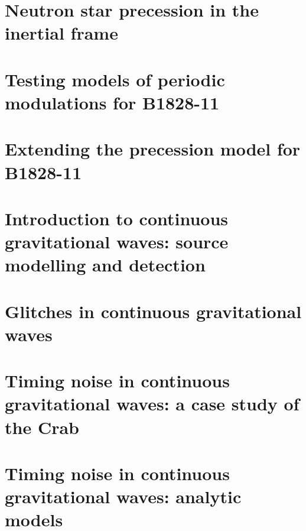 \documentclass[twoside]{thesis}
\begin{document}
\chapter{Neutron star precession in the inertial frame}
\label{sec: inertial frame}


\chapter{Testing models of periodic modulations for B1828-11}
\label{sec: testing models}


\chapter{Extending the precession model for B1828-11}
\label{sec: extending precession models}

\chapter{Introduction to continuous gravitational waves: source modelling and detection}
\label{sec: intro to cgw}


\chapter{Glitches in continuous gravitational waves}
\label{sec: glitches in cgw}

\chapter{Timing noise in continuous gravitational waves: a case study of the Crab}
\label{sec: timing noise in cgw}


\chapter{Timing noise in continuous gravitational waves: analytic models}
\label{sec: timing in cgw analytic}





\end{document}
